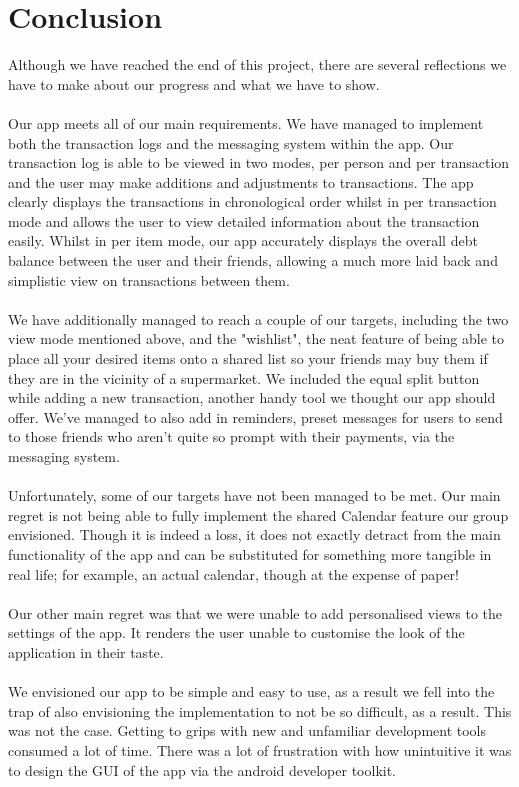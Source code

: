 \documentclass[a4paper,11pt]{article}
\begin{document}
\section*{Conclusion}
Although we have reached the end of this project, there are several reflections we have to make about our progress and what we have to show. 
\\
\\Our app meets all of our main requirements. We have managed to implement both the transaction logs and the messaging system within the app. Our transaction log is able to be viewed in two modes, per person and per transaction and the user may make additions and adjustments to transactions. The app clearly displays the transactions in chronological order whilst in per transaction mode and allows the user to view detailed information about the transaction easily. Whilst in per item mode, our app accurately displays the overall debt balance between the user and their friends, allowing a much more laid back and simplistic view on transactions between them.
\\
\\We have additionally managed to reach a couple of our targets, including the two view mode mentioned above, and the "wishlist", the neat feature of being able to place all your desired items onto a shared list so your friends may buy them if they are in the vicinity of a supermarket. We included the equal split button while adding a new transaction, another handy tool we thought our app should offer. We've managed to also add in reminders, preset messages for users to send to those friends who aren't quite so prompt with their payments, via the messaging system.
\\
\\Unfortunately, some of our targets have not been managed to be met. Our main regret is not being able to fully implement the shared Calendar feature our group envisioned. Though it is indeed a loss, it does not exactly detract from the main functionality of the app and can be substituted for something more tangible in real life; for example, an actual calendar, though at the expense of paper!
\\
\\Our other main regret was that we were unable to add personalised views to the settings of the app. It renders the user unable to customise the look of the application in their taste. 
\\
\\
We envisioned our app to be simple and easy to use, as a result we fell into the trap of also envisioning the implementation to not be so difficult, as a result. This was not the case. Getting to grips with new and unfamiliar development tools consumed a lot of time. There was a lot of frustration with how unintuitive it was to design the GUI of the app via the android developer toolkit.
\end{document}
